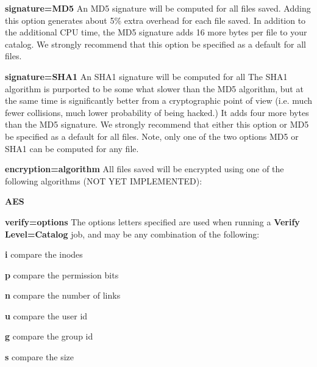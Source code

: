 \begin{description}
\begin{description}
\item {\bf signature=MD5}
An MD5 signature will be computed for all  files saved. Adding this option
generates about 5\% extra overhead  for each file saved. In addition to the
additional CPU time,  the MD5 signature adds 16 more bytes per file to your
catalog.  We strongly recommend that this option  be specified as a default
for all files. 

\item {\bf signature=SHA1}
An SHA1 signature will be computed for all  The SHA1 algorithm is purported to
be some  what slower than the MD5 algorithm, but at the same time is 
significantly better from a cryptographic point of view (i.e.  much fewer
collisions, much lower probability of being hacked.)  It adds four more bytes
than the MD5 signature.  We strongly recommend that either this option  or MD5
be specified as a default for all files. Note, only  one of the two options
MD5 or SHA1 can be computed for any  file. 

\item {\bf *encryption=\lt{}algorithm\gt{}}
All files saved will be  encrypted using one of the following algorithms (NOT
YET IMPLEMENTED):  

\begin{description}

\item {\bf *AES}
\end{description}

\item {\bf verify=\lt{}options\gt{}}
The options letters specified are used  when running a {\bf Verify
Level=Catalog} job, and may be any  combination of the following:  

\begin{description}

\item {\bf i}
compare the inodes  

\item {\bf p}
compare the permission bits  

\item {\bf n}
compare the number of links  

\item {\bf u}
compare the user id  

\item {\bf g}
compare the group id  

\item {\bf s}
compare the size  


\end{description}
\end{description}
\end{description}
